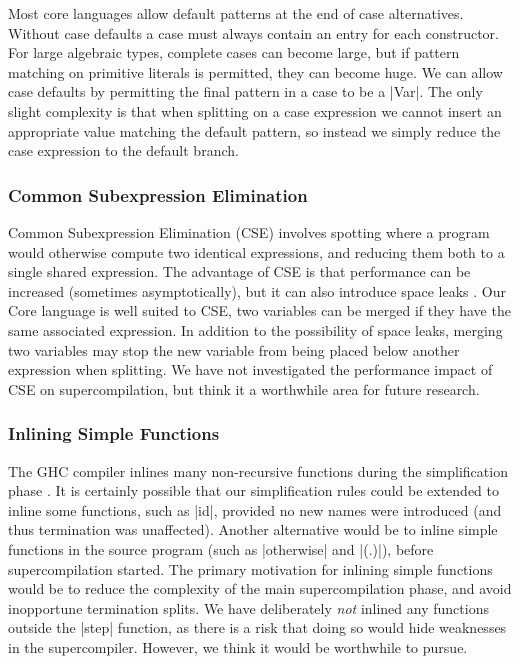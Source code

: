 \documentclass[draft]{sigplanconf}
\begin{document}
Most core languages allow default patterns at the end of case alternatives. Without case defaults a case must always contain an entry for each constructor. For large algebraic types, complete cases can become large, but if pattern matching on primitive literals is permitted, they can become huge. We can allow case defaults by permitting the final pattern in a case to be a |Var|. The only slight complexity is that when splitting on a case expression we cannot insert an appropriate value matching the default pattern, so instead we simply reduce the case expression to the default branch.

\subsubsection{Common Subexpression Elimination}

Common Subexpression Elimination (CSE) involves spotting where a program would otherwise compute two identical expressions, and reducing them both to a single shared expression. The advantage of CSE is that performance can be increased (sometimes asymptotically), but it can also introduce space leaks \cite{cse}. Our Core language is well suited to CSE, two variables can be merged if they have the same associated expression. In addition to the possibility of space leaks, merging two variables may stop the new variable from being placed below another expression when splitting. We have not investigated the performance impact of CSE on supercompilation, but think it a worthwhile area for future research.

\subsubsection{Inlining Simple Functions}

The GHC compiler inlines many non-recursive functions during the simplification phase \cite{spj:inlining}. It is certainly possible that our simplification rules could be extended to inline some functions, such as |id|, provided no new names were introduced (and thus termination was unaffected). Another alternative would be to inline simple functions in the source program (such as |otherwise| and |(.)|), before supercompilation started. The primary motivation for inlining simple functions would be to reduce the complexity of the main supercompilation phase, and avoid inopportune termination splits. We have deliberately \textit{not} inlined any functions outside the |step| function, as there is a risk that doing so would hide weaknesses in the supercompiler. However, we think it would be worthwhile to pursue.
\end{document}
